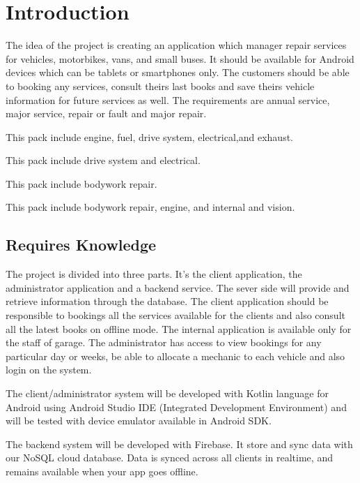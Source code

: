 \chapter{Introduction}

The idea of the project is creating an application which manager repair services for vehicles, motorbikes, vans, and small buses. It should be available for Android devices which can be tablets or smartphones only. The customers should be able to booking any services, consult theirs last books and save theirs vehicle information for future services as well. The requirements are annual service, major service, repair or fault and major repair.

\begin{description}[font=$\bullet$~\normalfont\scshape\color{red!50!black}]
\item [Annual Service] This pack include engine, fuel, drive system, electrical,and  exhaust. 
\item [Major Service] This pack include drive system and electrical.
\item [Repair/ Fault] This pack include bodywork repair.
\item [Major Repair] This pack include bodywork repair, engine, and internal and vision.
\end{description}


\section{Requires Knowledge}

The project is divided into three parts. It's the client application, the administrator application and a backend service. The sever side will provide and retrieve information through the database. The client application should be responsible to bookings all the services available for the clients and also consult all the latest books on offline mode. The internal application is available only for the staff of garage. The administrator has access  to view bookings for any particular day or weeks, be able to allocate a mechanic to each vehicle and also login on the system. 

The client/administrator system will be developed with Kotlin language for Android using Android Studio IDE (Integrated Development Environment) and will be tested with device emulator available in Android SDK.

The backend system will be developed with Firebase. It store and sync data with our NoSQL cloud database. Data is synced across all clients in realtime, and remains available when your app goes offline. 

